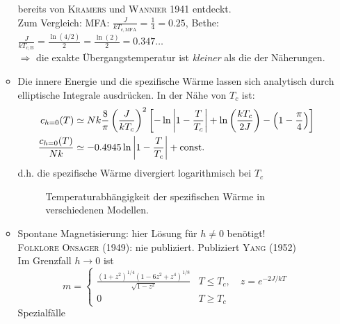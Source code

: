 \begin{enumerate}[A)]
\begin{itemize}
        bereits von \textsc{Kramers} und \textsc{Wannier} 1941 entdeckt. \\
        Zum Vergleich: MFA: $\frac{J}{k T_{c, \text{MFA}}} = \frac{1}{4} = 0.25$, Bethe: $\frac{J}{k T_{c, \text{B}}} = \frac{\ln(4/2)}{2} = \frac{\ln(2)}{2}=0.347\ldots$ \\
        $\Rightarrow$ die exakte Übergangstemperatur ist \emph{kleiner} als die der Näherungen.
        \item Die innere Energie und die spezifische Wärme lassen sich analytisch durch elliptische Integrale ausdrücken. In der Nähe von $T_c$ ist:
        \begin{equation}
            \begin{split}
                c_{h=0}(T) &\simeq N k \frac{8}{\pi} \left( \frac{J}{k T_c} \right)^2 \left[ - \ln \left| 1 - \frac{T}{T_c} \right|+ \ln \left( \frac{k T_c}{2 J} \right) - \left( 1 - \frac{\pi}{4} \right)  \right] \\
                \frac{c_{h=0}(T)}{N k} &\simeq -0.4945 \ln \left| 1 - \frac{T}{T_c} \right| + \text{const.}
            \end{split}
        \end{equation}
        d.h. die spezifische Wärme divergiert logarithmisch bei $T_c$ 
        \begin{figure}[H]
        \centering
        \def\svgwidth{0.5\textwidth}
        
        \caption{Temperaturabhängigkeit der spezifischen Wärme in verschiedenen Modellen.}
        \label{img:C_T_MFA_Bethe_Onsager}
\end{figure}
        \item Spontane Magnetisierung: hier Lösung für $h \neq 0$ benötigt! \\
        \textsc{Folklore Onsager} (1949): nie publiziert. Publiziert \textsc{Yang} (1952) \\
        Im Grenzfall $h \to 0$ ist
        \begin{equation}
            m =
            \begin{cases}
                \frac{ \left( 1+z^2 \right)^{1/4} \left( 1 - 6z^2 + z^4 \right)^{1/8}}{\sqrt{1-z^2}} & T \leq T_c, \quad z = e^{-2J / k T} \\
                0 & T \geq T_c
            \end{cases}
        \end{equation}
        Spezialfälle\\
        \begin{equation}
            \begin{split}

\end{split}
\end{equation}
\end{itemize}
\end{enumerate}
